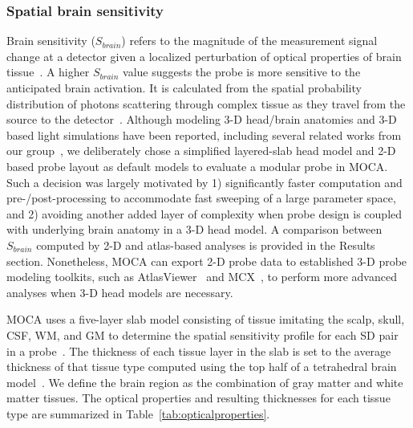 \subsubsection{Spatial brain sensitivity}
\label{sssec:averagebrainsensitivity}
Brain sensitivity ($S_{brain}$) refers to the magnitude of the measurement signal change at a detector given a localized perturbation of optical properties of brain tissue~\cite{Strangman2013}. A higher $S_{brain}$ value suggests the probe is more sensitive to the anticipated brain activation. It is calculated from the spatial probability distribution of photons scattering through complex tissue as they travel from the source to the detector~\cite{Brigadoi2015}. Although modeling 3-D head/brain anatomies and 3-D based light simulations have been reported, including several related works from our group~\cite{Fang2009,Fang2009a,Fang2010,Brain2Mesh2020}, we deliberately chose a simplified layered-slab head model and 2-D based probe layout as default models to evaluate a modular probe in \ac{MOCA}. Such a decision was largely motivated by 1) significantly faster computation and pre-/post-processing to accommodate fast sweeping of a large parameter space, and 2) avoiding another added layer of complexity when probe design is coupled with underlying brain anatomy in a 3-D head model. A comparison between $S_{brain}$ computed by 2-D and atlas-based analyses is provided in the Results section. Nonetheless, \ac{MOCA} can export 2-D probe data to established 3-D probe modeling toolkits, such as AtlasViewer~\cite{Aasted2015} and \ac{MCX}~\cite{Fang2009}, to perform more advanced analyses when 3-D head models are necessary.

\ac{MOCA} uses a five-layer slab model consisting of tissue imitating the scalp, skull, \ac{CSF}, \ac{WM}, and \ac{GM} to determine the spatial sensitivity profile for each \ac{SD} pair in a probe~\cite{Okada2003}. The thickness of each tissue layer in the slab is set to the average thickness of that tissue type computed using the top half of a tetrahedral brain model~\cite{Sanchez2012}. We define the brain region as the combination of gray matter and white matter tissues. The optical properties and resulting thicknesses for each tissue type are summarized in Table~\ref{tab:opticalproperties}.

